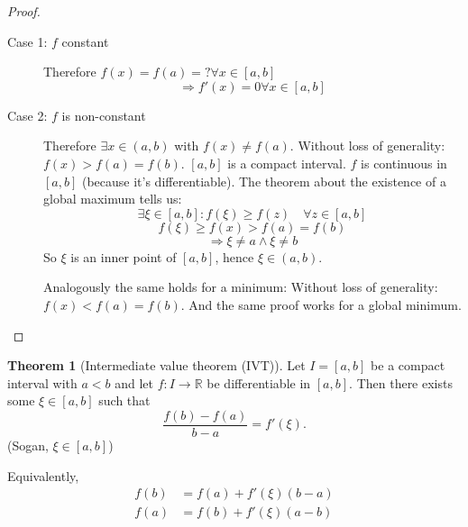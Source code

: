 \documentclass[a4paper,landscape,twocolumn]{article}
\theoremstyle{definition}
\newtheorem{theorem}{Theorem}
\begin{document}
\begin{proof}
  \begin{description}
    \item[Case 1: $f$ constant]
      Therefore $f(x) = f(a) = ? \forall x \in [a,b]$
      \[ \Rightarrow f'(x) = 0 \forall x \in [a,b] \]
    \item[Case 2: $f$ is non-constant]
      Therefore $\exists x \in (a, b)$ with $f(x) \neq f(a)$.
      Without loss of generality: $f(x) > f(a) = f(b)$.
      $[a,b]$ is a compact interval. $f$ is continuous in $[a,b]$
      (because it's differentiable). The theorem about the
      existence of a global maximum tells us:
      \[ \exists \xi \in [a,b]: f(\xi) \geq f(z) \quad\forall z \in [a,b] \]
      \[ f(\xi) \geq f(x) > f(a) = f(b) \]
      \[ \Rightarrow \xi \neq a \land \xi \neq b \]
      So $\xi$ is an inner point of $[a,b]$, hence $\xi \in (a,b)$.

      Analogously the same holds for a minimum:
      Without loss of generality: $f(x) < f(a) = f(b)$.
      And the same proof works for a global minimum.
  \end{description}
\end{proof}
%
\begin{theorem}[Intermediate value theorem (IVT)]
  Let $I = [a,b]$ be a compact interval with $a<b$ and let $f: I \to \mathbb R$
  be differentiable in $[a,b]$. Then there exists some $\xi \in [a,b]$ such that
  \[ \frac{f(b) - f(a)}{b - a} = f'(\xi). \]
  (Sogan, $\xi \in [a,b]$)

  Equivalently,
  \begin{align*}
    f(b) &= f(a) + f'(\xi)(b - a) \\
    f(a) &= f(b) + f'(\xi)(a - b)
  \end{align*}
\end{theorem}
%
\end{document}
